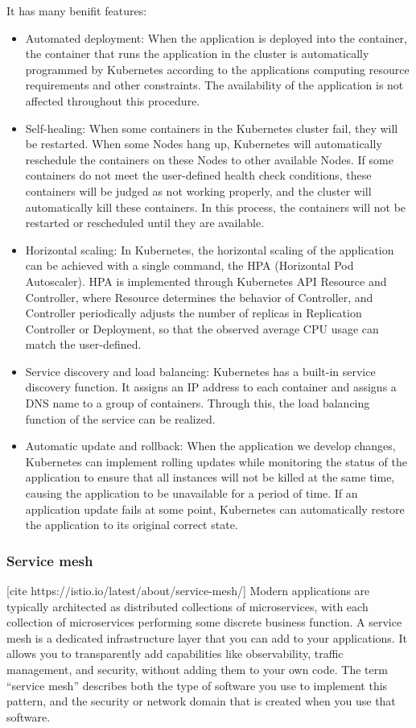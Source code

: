 \documentclass[12pt, draftclsnofoot, onecolumn]{IEEEtran}
\begin{document}
It has many benifit features:
\begin{itemize}
	\item Automated deployment: When the application is deployed into the container, the container that runs the application in the cluster is automatically programmed by Kubernetes according to the applications computing resource requirements and other constraints. The availability of the application is not affected throughout this procedure.
	\item Self-healing: When some containers in the Kubernetes cluster fail, they will be restarted.  When some Nodes hang up, Kubernetes will automatically reschedule the containers on these Nodes to other available Nodes.  If some containers do not meet the user-defined health check conditions, these containers will be judged as not working properly, and the cluster will automatically kill these containers. In this process, the containers will not be restarted or rescheduled until they are available.
	\item Horizontal scaling: In Kubernetes, the horizontal scaling of the application can be achieved with a single command, the HPA (Horizontal Pod Autoscaler).  HPA is implemented through Kubernetes API Resource and Controller, where Resource determines the behavior of Controller, and Controller periodically adjusts the number of replicas in Replication Controller or Deployment, so that the observed average CPU usage can match the user-defined.
	\item Service discovery and load balancing:  Kubernetes has a built-in service discovery function. It assigns an IP address to each container and assigns a DNS name to a group of containers. Through this, the load balancing function of the service can be realized.
	\item Automatic update and rollback: When the application we develop changes, Kubernetes can implement rolling updates while monitoring the status of the application to ensure that all instances will not be killed at the same time, causing the application to be unavailable for a period of time.  If an application update fails at some point, Kubernetes can automatically restore the application to its original correct state.
\end{itemize}

\subsubsection{Service mesh} 
[cite https://istio.io/latest/about/service-mesh/]
Modern applications are typically architected as distributed collections of microservices, with each collection of microservices performing some discrete business function. A service mesh is a dedicated infrastructure layer that you can add to your applications. It allows you to transparently add capabilities like observability, traffic management, and security, without adding them to your own code. The term “service mesh” describes both the type of software you use to implement this pattern, and the security or network domain that is created when you use that software.
\end{document}
